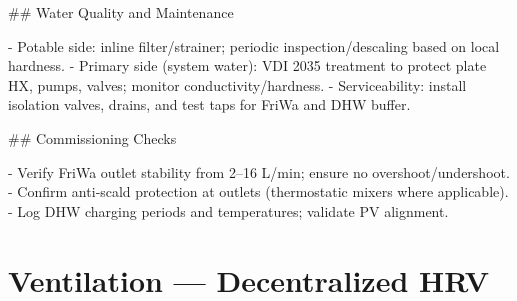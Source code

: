 \documentclass[11pt,oneside]{report}
\begin{document}
\begin{markdown}
## Water Quality and Maintenance

- Potable side: inline filter/strainer; periodic inspection/descaling based on local hardness.
- Primary side (system water): VDI 2035 treatment to protect plate HX, pumps, valves; monitor conductivity/hardness.
- Serviceability: install isolation valves, drains, and test taps for FriWa and DHW buffer.

## Commissioning Checks

- Verify FriWa outlet stability from 2–16 L/min; ensure no overshoot/undershoot.
- Confirm anti‑scald protection at outlets (thermostatic mixers where applicable).
- Log DHW charging periods and temperatures; validate PV alignment.
\end{markdown}

\chapter{Ventilation — Decentralized HRV}
\end{document}
